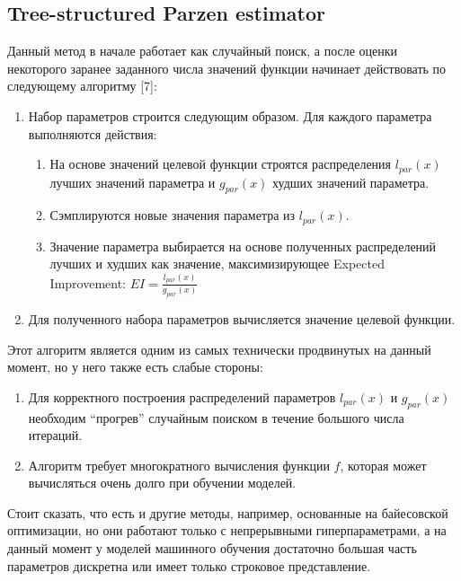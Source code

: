 \documentclass[a4paper,12pt]{article}
\begin{document}
\subsection{Tree-structured Parzen estimator}
Данный метод в начале работает как случайный поиск, а после оценки некоторого заранее заданного числа значений функции начинает действовать по следующему алгоритму [7]:
\begin{enumerate}
    \item Набор параметров строится следующим образом. Для каждого параметра выполняются действия:
    \begin{enumerate}
        \item На основе значений целевой функции строятся распределения $l_{par}(x)$ лучших значений параметра и $g_{par}(x)$ худших значений параметра.
        \item Сэмплируются новые значения параметра из $l_{par}(x)$.
        \item Значение параметра выбирается на основе полученных распределений лучших и худших как значение, максимизирующее Expected Improvement: $EI = \frac{l_{par}(x)}{g_{par}(x)}$
    \end{enumerate}
    \item Для полученного набора параметров вычисляется значение целевой функции.
    
\end{enumerate}

Этот алгоритм является одним из самых технически продвинутых на данный момент, но у него также есть слабые стороны:
\begin{enumerate}
    \item Для корректного построения распределений параметров $l_{par}(x)$ и $g_{par}(x)$ необходим ``прогрев'' случайным поиском в течение большого числа итераций.
    \item Алгоритм требует многократного вычисления функции $f$, которая может вычисляться очень долго при обучении моделей.
\end{enumerate}

Стоит сказать, что есть и другие методы, например, основанные на байесовской оптимизации, но они работают только с непрерывными гиперпараметрами, а на данный момент у моделей машинного обучения достаточно большая часть параметров дискретна или имеет только строковое представление.

\newpage
\end{document}
